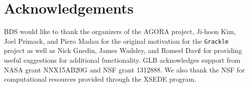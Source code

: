 \section*{Acknowledgements}

BDS would like to thank the organizers of the AGORA project, Ji-hoon
Kim, Joel Primack, and Piero Madau for the original motivation for the
\texttt{Grackle} project as well as Nick Gnedin, James Wadsley, and
Romeel Dav$\acute{\rm e}$ for providing useful suggestions for
additional functionality.  GLB acknowledges support from
NASA grant NNX15AB20G and NSF grant 1312888.  We also thank the NSF
for computational resources provided through the XSEDE program.
